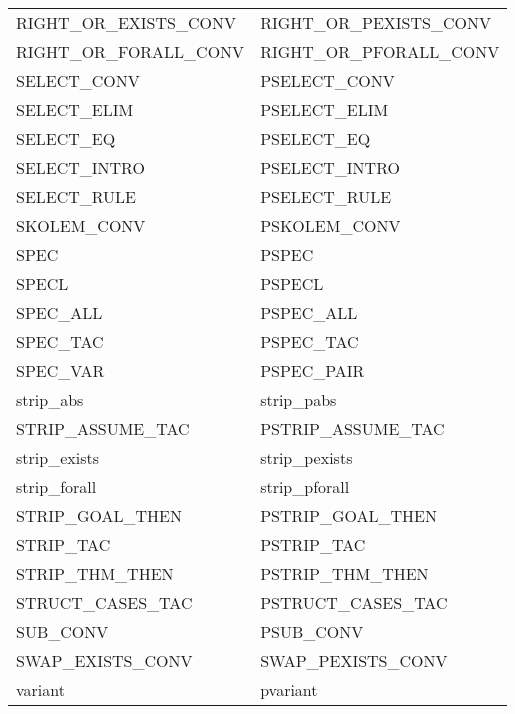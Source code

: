 {\begin{center}
\begin{tabular}[t]{|l|l|}
        RIGHT\_OR\_EXISTS\_CONV     &   RIGHT\_OR\_PEXISTS\_CONV    \\
        RIGHT\_OR\_FORALL\_CONV     &   RIGHT\_OR\_PFORALL\_CONV    \\
        SELECT\_CONV                &   PSELECT\_CONV               \\
        SELECT\_ELIM                &   PSELECT\_ELIM               \\
        SELECT\_EQ                  &   PSELECT\_EQ                 \\
        SELECT\_INTRO               &   PSELECT\_INTRO              \\
        SELECT\_RULE                &   PSELECT\_RULE               \\
        SKOLEM\_CONV                &   PSKOLEM\_CONV               \\
        SPEC                        &   PSPEC                       \\
        SPECL                       &   PSPECL                      \\
        SPEC\_ALL                   &   PSPEC\_ALL                  \\
        SPEC\_TAC                   &   PSPEC\_TAC                  \\
        SPEC\_VAR                   &   PSPEC\_PAIR                 \\
        strip\_abs                  &   strip\_pabs                 \\
        STRIP\_ASSUME\_TAC          &   PSTRIP\_ASSUME\_TAC         \\
        strip\_exists               &   strip\_pexists              \\
        strip\_forall               &   strip\_pforall              \\
        STRIP\_GOAL\_THEN           &   PSTRIP\_GOAL\_THEN          \\
        STRIP\_TAC                  &   PSTRIP\_TAC                 \\
        STRIP\_THM\_THEN            &   PSTRIP\_THM\_THEN           \\
        STRUCT\_CASES\_TAC          &   PSTRUCT\_CASES\_TAC         \\
        SUB\_CONV                   &   PSUB\_CONV                  \\
        SWAP\_EXISTS\_CONV          &   SWAP\_PEXISTS\_CONV         \\
        variant                     &   pvariant                    \\

\end{tabular}
\end{center}}
